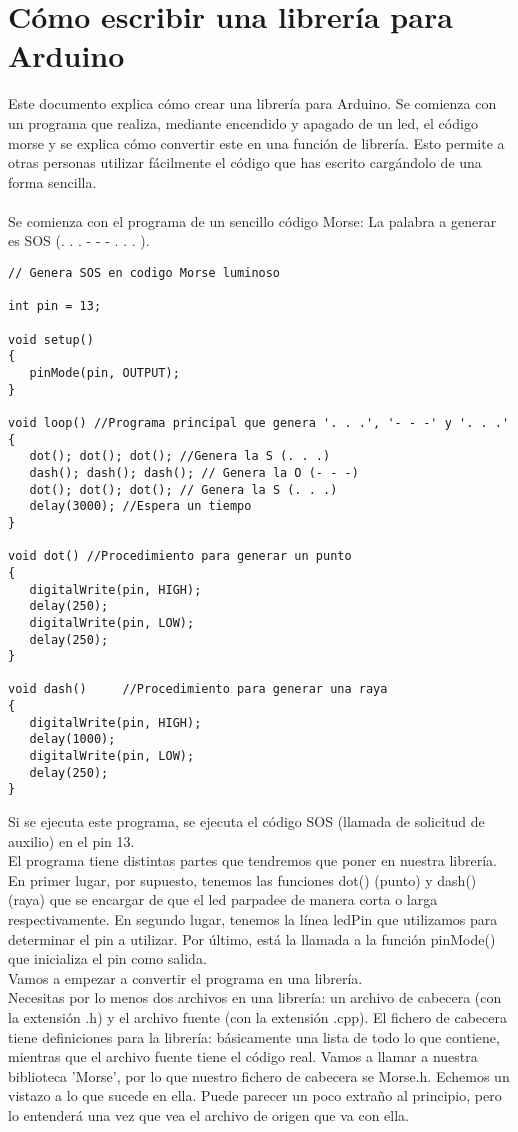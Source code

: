 \chapter{Cómo escribir una librería para Arduino}

Este documento explica cómo crear una librería para Arduino. Se comienza con un programa que realiza, mediante encendido y apagado de un led, el código morse y se explica cómo convertir este en una función de librería. Esto permite a otras personas utilizar fácilmente el código que has escrito cargándolo de una forma sencilla.\\\\
Se comienza con el programa de un sencillo código Morse: La palabra a generar es SOS (. . . - - - . . . ).
\begin{lstlisting}
// Genera SOS en codigo Morse luminoso

int pin = 13;

void setup()
{
   pinMode(pin, OUTPUT);
}

void loop() //Programa principal que genera '. . .', '- - -' y '. . .'
{
   dot(); dot(); dot(); //Genera la S (. . .)
   dash(); dash(); dash(); // Genera la O (- - -)
   dot(); dot(); dot(); // Genera la S (. . .)
   delay(3000); //Espera un tiempo
}

void dot() //Procedimiento para generar un punto
{
   digitalWrite(pin, HIGH);
   delay(250);
   digitalWrite(pin, LOW);
   delay(250);
}

void dash()     //Procedimiento para generar una raya
{
   digitalWrite(pin, HIGH);
   delay(1000);
   digitalWrite(pin, LOW);
   delay(250);
}
\end{lstlisting}
Si se ejecuta este programa, se ejecuta el código SOS (llamada de solicitud de auxilio) en el pin 13.\\
El programa tiene distintas partes que tendremos que poner en nuestra librería. En primer lugar, por supuesto, tenemos las funciones dot() (punto) y dash() (raya) que se encargar de que el led parpadee de manera corta o larga respectivamente. En segundo lugar, tenemos la línea ledPin que utilizamos para determinar el pin a utilizar. Por último, está la llamada a la función pinMode() que inicializa el pin como salida.\\
Vamos a empezar a convertir el programa en una librería.\\
Necesitas por lo menos dos archivos en una librería: un archivo de cabecera (con la extensión .h) y el archivo fuente (con la extensión .cpp). El fichero de cabecera tiene definiciones para la librería: básicamente una lista de todo lo que contiene, mientras que el archivo fuente tiene el código real. Vamos a llamar a nuestra biblioteca 'Morse', por lo que nuestro fichero de cabecera se Morse.h. Echemos un vistazo a lo que sucede en ella. Puede parecer un poco extraño al principio, pero lo entenderá una vez que vea el archivo de origen que va con ella.\\
